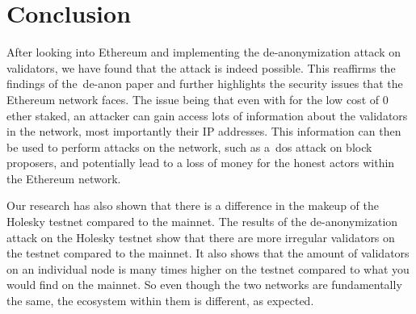 

\section{Conclusion}\label{sec:conclusion}
After looking into Ethereum and implementing the de-anonymization attack on validators, we have found that the attack is indeed possible.
This reaffirms the findings of the~\gls{de-anon paper} and further highlights the security issues that the Ethereum network faces.
The issue being that even with for the low cost of 0 ether staked, an attacker can gain access lots of information about the validators in the network, most importantly their IP addresses.
This information can then be used to perform attacks on the network, such as a~\gls{dos} attack on block proposers, and potentially lead to a loss of money for the honest actors within the Ethereum network.


Our research has also shown that there is a difference in the makeup of the Holesky testnet compared to the mainnet.
The results of the de-anonymization attack on the Holesky testnet show that there are more irregular validators on the testnet compared to the mainnet.
It also shows that the amount of validators on an individual node is many times higher on the testnet compared to what you would find on the mainnet.
So even though the two networks are fundamentally the same, the ecosystem within them is different, as expected.